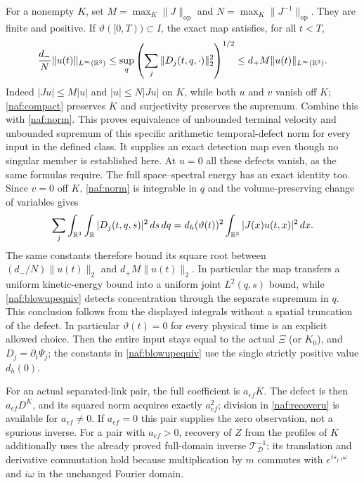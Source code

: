 For a nonempty $K$, set
$M=\max_K\|J\|_{\mathrm{op}}$ and
$N=\max_K\|J^{-1}\|_{\mathrm{op}}$. They are finite and positive.
If $\vartheta([0,T))\subset I$, the exact map satisfies, for all $t<T$,
\begin{equation}
 \frac{d_-}{N}\|u(t)\|_{L^\infty(\mathbb R^3)}
 \leq \sup_q\left(\sum_j\|D_j(t,q,\cdot)\|_2^2\right)^{1/2}
 \leq d_+M\|u(t)\|_{L^\infty(\mathbb R^3)}.
 \label{naf:blowupequiv}
\end{equation}
Indeed $|Ju|\leq M|u|$ and $|u|\leq N|Ju|$ on $K$, while both $u$
and $v$ vanish off $K$; \eqref{naf:compact} preserves $K$ and
surjectivity preserves the supremum. Combine this with \eqref{naf:norm}.
This proves equivalence of unbounded terminal velocity and unbounded
supremum of this specific arithmetic temporal-defect norm for every
input in the defined class. It supplies an exact detection map even
though no singular member is established here. At $u=0$ all these
defects vanish, as the same formulas require.
The full space--spectral energy has an exact identity too. Since $v=0$
off $K$, \eqref{naf:norm} is integrable in $q$ and the volume-preserving
change of variables gives
\[
 \sum_j\int_{\mathbb R^3}\int_\mathbb R|D_j(t,q,s)|^2\,ds\,dq
   =d_h(\vartheta(t))^2\int_{\mathbb R^3}|J(x)u(t,x)|^2\,dx.
\]
The same constants therefore bound its square root between
$(d_-/N)\|u(t)\|_2$ and $d_+M\|u(t)\|_2$. In particular the map
transfers a uniform kinetic-energy bound into a uniform joint
$L^2(q,s)$ bound, while \eqref{naf:blowupequiv} detects concentration
through the separate supremum in $q$. This conclusion follows from the
displayed integrals without a spatial truncation of the defect.
In particular $\vartheta(t)=0$ for every physical time is an explicit
allowed choice. Then the entire input stays equal to the actual
$\Xi$ (or $K_0$), and $D_j=\partial_t\Psi_j$; the constants in
\eqref{naf:blowupequiv} use the single strictly positive value $d_h(0)$.

For an actual separated-link pair, the full coefficient is $a_{ef}K$.
The defect is then $a_{ef}D^K$, and its squared norm acquires exactly
$a_{ef}^2$; division in \eqref{naf:recoveru} is available for
$a_{ef}\ne0$. If $a_{ef}=0$ this pair supplies the zero observation,
not a spurious inverse. For a pair with $a_{ef}>0$, recovery of $Z$ from
the profiles of $K$ additionally uses the already proved full-domain
inverse $\mathcal T_{\mathcal D}^{-1}$; its translation and derivative
commutation hold because multiplication by $m$ commutes with
$e^{is_{j,t}\omega}$ and $i\omega$ in the unchanged Fourier domain.

